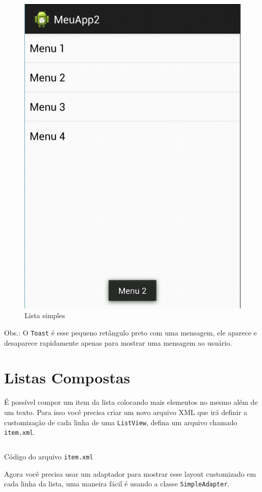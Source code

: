 \documentclass[a4paper,12pt,brazil,doubleside]{book}
\begin{document}
\begin{singlespace}
\begin{figure}[H]
  \centering
  \includegraphics[width=.7\textwidth]{figuras/design/lista.png}
  \caption{Lista simples}
  \label{fig:e}
\end{figure}

Obs.: O \texttt{Toast} é esse pequeno retângulo preto com uma mensagem, ele aparece e desaparece rapidamente apenas para mostrar uma mensagem ao usuário.

\section{Listas Compostas}
É possível compor um item da lista colocando mais elementos no mesmo além de um texto. Para isso você precisa criar um novo arquivo XML que irá definir a customização de cada linha de uma \texttt{ListView}, defina um arquivo chamado \texttt{\textcolor{mygreen}{item.xml}}.

\newpage

\begin{listing}[H]
\inputminted[linenos=true,fontsize=\small,frame=lines, framesep=2mm, tabsize=2,numbersep=5pt]{xml}{../../src/android/design/item.xml}
\caption{Código do arquivo \texttt{\textcolor{mygreen}{item.xml}}}
\end{listing}	

Agora você precisa usar um adaptador para mostrar esse layout customizado em cada linha da lista, uma maneira fácil é usando a classe \texttt{SimpleAdapter}.


\end{singlespace}
\end{document}
